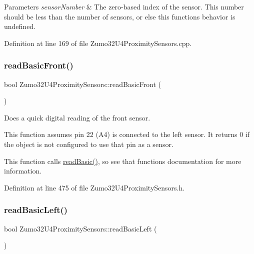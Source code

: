 \begin{DoxyParams}{Parameters}
{\em sensor\+Number} & The zero-\/based index of the sensor. This number should be less than the number of sensors, or else this function\textquotesingle{}s behavior is undefined. \\
\hline
\end{DoxyParams}


Definition at line 169 of file Zumo32\+U4\+Proximity\+Sensors.\+cpp.

\mbox{\label{class_zumo32_u4_proximity_sensors_a6394e540d0bd14ad9b2637d0772fff5c}} 
\subsubsection{\texorpdfstring{read\+Basic\+Front()}{readBasicFront()}}
{\footnotesize\ttfamily bool Zumo32\+U4\+Proximity\+Sensors\+::read\+Basic\+Front (\begin{DoxyParamCaption}{ }\end{DoxyParamCaption})\hspace{0.3cm}{\ttfamily [inline]}}



Does a quick digital reading of the front sensor. 

This function assumes pin 22 (A4) is connected to the left sensor. It returns 0 if the object is not configured to use that pin as a sensor.

This function calls \hyperlink{class_zumo32_u4_proximity_sensors_a5c254dc2adf7c47203384241582349d3}{read\+Basic()}, so see that function\textquotesingle{}s documentation for more information. 

Definition at line 475 of file Zumo32\+U4\+Proximity\+Sensors.\+h.

\mbox{\label{class_zumo32_u4_proximity_sensors_a7d72d0576fa21327d6295b61b61f88f6}} 
\subsubsection{\texorpdfstring{read\+Basic\+Left()}{readBasicLeft()}}
{\footnotesize\ttfamily bool Zumo32\+U4\+Proximity\+Sensors\+::read\+Basic\+Left (\begin{DoxyParamCaption}{ }\end{DoxyParamCaption})\hspace{0.3cm}{\ttfamily [inline]}}



